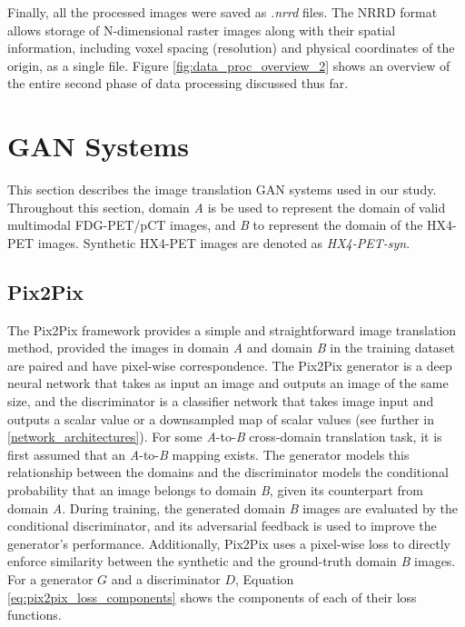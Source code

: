 Finally, all the processed images were saved as \textit{.nrrd} files. The NRRD format allows storage of N-dimensional raster images along with their spatial information, including voxel spacing (resolution) and physical coordinates of the origin, as a single file. Figure \ref{fig:data_proc_overview_2} shows an overview of the entire second phase of data processing discussed thus far.



\section{GAN Systems}
\label{GAN_Systems}
This section describes the image translation GAN systems used in our study. Throughout this section, domain \textit{A} is be used to represent the domain of valid multimodal FDG-PET/pCT images, and \textit{B} to represent the domain of the HX4-PET images. Synthetic HX4-PET images are denoted as \textit{HX4-PET-syn}.


\subsection{Pix2Pix}
\label{pix2pix}
The Pix2Pix framework provides a simple and straightforward image translation method, provided the images in domain \textit{A} and domain \textit{B} in the training dataset are paired and have pixel-wise correspondence. The Pix2Pix generator is a deep neural network that takes as input an image and outputs an image of the same size, and the discriminator is a classifier network that takes image input and outputs a scalar value or a downsampled map of scalar values (see further in \ref{network_architectures}). For some \textit{A}-to-\textit{B} cross-domain translation task, it is first assumed that an \textit{A}-to-\textit{B} mapping exists. The generator models this relationship between the domains and the discriminator models the conditional probability that an image belongs to domain \textit{B}, given its counterpart from domain \textit{A}. During training, the generated domain \textit{B} images are evaluated by the conditional discriminator, and its adversarial feedback is used to improve the generator's performance. Additionally, Pix2Pix uses a pixel-wise loss to directly enforce similarity between the synthetic and the ground-truth domain \textit{B} images. For a generator $G$ and a discriminator $D$, Equation \ref{eq:pix2pix_loss_components} shows the components of each of their loss functions. 

